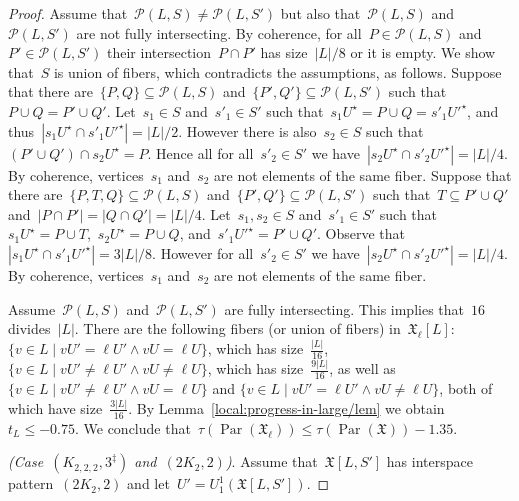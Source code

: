 \documentclass[english,a4paper]{article}
\theoremstyle{plain}
\theoremstyle{definition}
\newcommand{\abs}[1]{| #1 |}
\newcommand{\coherentConfig}{\ensuremath{\mathfrak{X}}}
\newcommand{\interspace}[2]{\ensuremath{\coherentConfig[#1,#2]}}
\newcommand{\equivalenceClasses}[1]{\ensuremath{\mathcal{P}(#1)}}
\DeclareMathOperator{\parameters}{Par}
\newcommand{\ipfourMatching}{\ensuremath{(\disjointCliques{2}{2},2)}}
\newcommand{\ipsixMatchingComplementD}{\ensuremath{(\clique{2,2,2},3^\ddag)}}
\newcommand{\clique}[1]{\ensuremath{K_{#1}}}
\newcommand{\disjointCliques}[2]{\ensuremath{#1 \clique{#2}}}
\begin{document}
\begin{proof}
    Assume that~$\equivalenceClasses{L,S} \neq \equivalenceClasses{L,S'}$ but also that~$\equivalenceClasses{L,S}$ and~$\equivalenceClasses{L, S'}$ are not fully intersecting.
    By coherence, for all~$P \in \equivalenceClasses{L,S}$ and~$P' \in \equivalenceClasses{L,S'}$ their intersection~$P \cap P'$ has size~$|L|/8$ or it is empty.
    We show that~$S$ is union of fibers, which contradicts the assumptions, as follows.
    Suppose that there are~$\{P,Q\} \subseteq \equivalenceClasses{L,S}$ and~$\{P',Q'\} \subseteq \equivalenceClasses{L,S'}$ such that~$P \cup Q = P' \cup Q'$.
    Let~$s_1 \in S$ and~$s'_1 \in S'$ such that~$s_1 U^\star = P \cup Q = s'_1 U'^\star$, and thus~$|s_1 U^\star \cap s'_1 U'^\star| = |L|/2$.
    However there is also~$s_2 \in S$ such that~$(P' \cup Q') \cap s_2 U^\star = P$.
    Hence all for all~$s'_2 \in S'$ we have~$|s_2 U^\star \cap s'_2 U'^\star| = |L|/4$.
    By coherence, vertices~$s_1$ and~$s_2$ are not elements of the same fiber.
    Suppose that there are~$\{P,T,Q\} \subseteq \equivalenceClasses{L,S}$ and~$\{P',Q'\} \subseteq \equivalenceClasses{L,S'}$ such that~$T \subseteq P' \cup Q'$ and~$|P \cap P'| = |Q \cap Q'| = |L|/4$.
    Let~$s_1,s_2 \in S$ and~$s'_1 \in S'$ such that~$s_1 U^\star = P \cup T$,~$s_2 U^\star = P \cup Q$, and~$s'_1 U'^\star = P' \cup Q'$.
    Observe that~$|s_1 U^\star \cap s'_1 U'^\star| = 3|L|/8$.
    However for all~$s'_2 \in S'$ we have~$|s_2 U^\star \cap s'_2 U'^\star| = |L|/4$.
    By coherence, vertices~$s_1$ and~$s_2$ are not elements of the same fiber.

    Assume~$\equivalenceClasses{L,S}$ and~$\equivalenceClasses{L, S'}$ are fully intersecting.
    This implies that~$16$ divides~$|L|$.
    There are the following fibers (or union of fibers) in~$\coherentConfig_\ell[L]$:
    $\{v \in L \mid vU' =    \ell U'\wedge vU =    \ell U \}$, which has size~$\frac{\abs{L}}{16}$,
    $\{v \in L \mid vU' \neq \ell U'\wedge vU \neq \ell U \}$, which has size~$\frac{9\abs{L}}{16}$, as well as
    $\{v \in L \mid vU' \neq \ell U'\wedge vU =    \ell U \}$ and
    $\{v \in L \mid vU' =    \ell U'\wedge vU \neq \ell U \}$, both of which have size~$\frac{3\abs{L}}{16}$.
    By Lemma~\ref{local:progress-in-large/lem} we obtain~$t_L \leq -0.75$. We conclude that~$\tau(\parameters(\coherentConfig_\ell)) \leq \tau(\parameters(\coherentConfig))- 1.35$.



    \textit{(Case~$\ipsixMatchingComplementD$ and~$\ipfourMatching$)}.
    Assume that~$\interspace{L}{S'}$ has interspace pattern~$\ipfourMatching$ and let~$U' = U^1_1(\interspace{L}{S'})$.


\end{proof}
\end{document}
